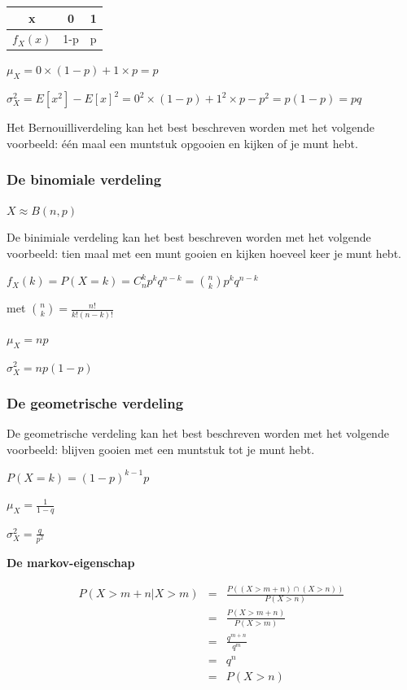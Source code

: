 \documentclass[a4paper,12pt]{article}
\begin{document}
\begin{table}[H]
\centering
\begin{tabular}{|c|c|c|}
\hline
x&0&1\\
\hline
$f_X(x)$ & 1-p & p\\
\hline
\end{tabular}
\end{table}
$\mu_X=0\times(1-p)+1\times p = p$

$\sigma^2_X=E[x^2]-E[x]^2=0^2\times (1-p)+1^2\times p - p^2 = p(1-p)=pq$

Het Bernouilliverdeling kan het best beschreven worden met het volgende voorbeeld:
één maal een muntstuk opgooien en kijken of je munt hebt.

\subsubsection{De binomiale verdeling}
$X\approx B(n,p)$

De binimiale verdeling kan het best beschreven worden met het volgende voorbeeld:
tien maal met een munt gooien en kijken hoeveel keer je munt hebt.

$f_X(k)=P(X=k)=C^k_np^kq^{n-k}=\binom{n}{k}p^kq^{n-k}$

met $\binom{n}{k}=\frac{n!}{k!(n-k)!}$

$\mu_X=np$

$\sigma^2_X=np(1-p)$

\subsubsection{De geometrische verdeling}
De geometrische verdeling kan het best beschreven worden met het volgende voorbeeld:
blijven gooien met een muntstuk tot je munt hebt.

$P(X=k) = (1-p)^{k-1}p$

$\mu_X = \frac{1}{1-q}$

$\sigma^2_X=\frac{q}{p^2}$

\textbf{De markov-eigenschap}

\begin{equation}
\begin{array}{rcl}
P(X>m+n|X>m)&=&\frac{P((X>m+n)\cap (X>n))}{P(X>n)}\\
&=& \frac{P(X>m+n)}{P(X>m)}\\
&=&\frac{q^{m+n}}{q^m}\\
&=&q^n\\
&=&P(X>n)
\end{array}
\end{equation}
\end{document}

